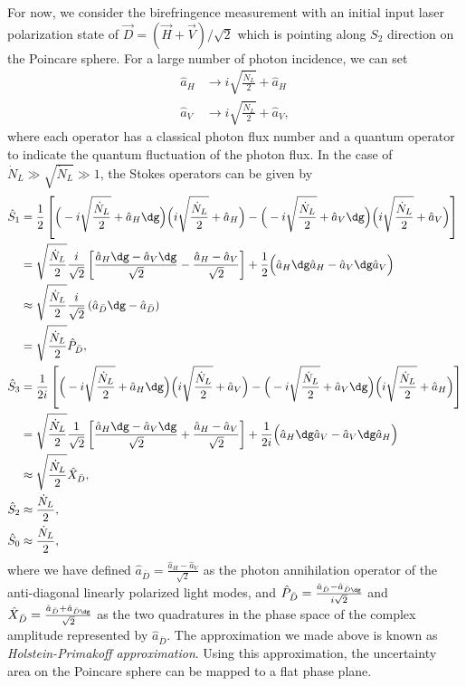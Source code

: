 \documentclass[]{report}
\begin{document}
For now, we consider the birefringence measurement with an initial input laser polarization state of $ \vec{D}=\left( \vec{H}+\vec{V}\right)/\sqrt{2} $ which is pointing along $ S_2 $ direction on the Poincare sphere. For a large number of photon incidence, we can set 
\begin{subequations}\label{eqs:cohaHV}
\begin{align}
\hat{a}_H &\rightarrow i\sqrt{\frac{\dot{N}_L}{2}} + \hat{a}_H\\
\hat{a}_V &\rightarrow i\sqrt{\frac{\dot{N}_L}{2}} + \hat{a}_V,
\end{align}
\end{subequations}
where each operator has a classical photon flux number and a quantum operator to indicate the quantum fluctuation of the photon flux. In the case of $ \dot{N}_L\gg \sqrt{\dot{N}_L}\gg 1 $, the Stokes operators can be given by
\begin{align}
\hat{S}_1 &= \frac{1}{2}\left[ \Big( -i\sqrt{\frac{\dot{N}_L}{2}} + \hat{a}_H\dg \Big) \Big( i\sqrt{\frac{\dot{N}_L}{2}} + \hat{a}_H\Big) -  \Big( -i\sqrt{\frac{\dot{N}_L}{2}} + \hat{a}_V\dg\Big)  \Big(i\sqrt{\frac{\dot{N}_L}{2}} + \hat{a}_V \Big) \right]\\
&= \sqrt{\frac{\dot{N}_L}{2}} \frac{i}{\sqrt{2}} \left[\frac{\hat{a}_H\dg-\hat{a}_V\dg}{\sqrt{2}} - \frac{\hat{a}_H-\hat{a}_V}{\sqrt{2}} \right] + \frac{1}{2} \Big( \hat{a}_H\dg \hat{a}_H -  \hat{a}_V\dg \hat{a}_V \Big)\\
&\approx \sqrt{\frac{\dot{N}_L}{2}} \frac{i}{\sqrt{2}} \left( \hat{a}_{\bar{D}}\dg-\hat{a}_{\bar{D}}\right)\\
&= \sqrt{\frac{\dot{N}_L}{2}} \hat{P}_{\bar{D}},\\
\hat{S}_3 &= \frac{1}{2i} \left[ \Big( -i\sqrt{\frac{\dot{N}_L}{2}} + \hat{a}_H\dg \Big) \Big(i\sqrt{\frac{\dot{N}_L}{2}} + \hat{a}_V \Big) -  \Big( -i\sqrt{\frac{\dot{N}_L}{2}} + \hat{a}_V\dg\Big) \Big( i\sqrt{\frac{\dot{N}_L}{2}} + \hat{a}_H\Big) \right]\\
&= \sqrt{\frac{\dot{N}_L}{2}}  \frac{1}{\sqrt{2}}\left[ \frac{\hat{a}_H\dg-\hat{a}_V\dg}{\sqrt{2}} + \frac{\hat{a}_H-\hat{a}_V}{\sqrt{2}} \right] +\frac{1}{2i} \Big( \hat{a}_H\dg \hat{a}_V -  \hat{a}_V\dg \hat{a}_H \Big)\\
&\approx \sqrt{\frac{\dot{N}_L}{2}} \hat{X}_{\bar{D}},\\
\hat{S}_2 &\approx \frac{\dot{N}_L}{2},\\
\hat{S}_0 &\approx \frac{\dot{N}_L}{2},
\end{align}
where we have defined $ \hat{a}_{\bar{D}} = \frac{\hat{a}_H -\hat{a}_V}{\sqrt{2}} $ as the photon annihilation operator of the anti-diagonal linearly polarized light modes, and $ \hat{P}_{\bar{D}}=\frac{\hat{a}_{\bar{D}}-\hat{a}_{\bar{D}\dg}}{i\sqrt{2}} $ and $ \hat{X}_{\bar{D}}=\frac{\hat{a}_{\bar{D}}+\hat{a}_{\bar{D}\dg}}{\sqrt{2}} $ as the two quadratures in the phase space of the complex amplitude represented by $ \hat{a}_{\bar{D}} $. The approximation we made above is known as \textit{Holstein-Primakoff approximation}. Using this approximation, the uncertainty area on the Poincare sphere can be mapped to a flat phase plane. 
\end{document}
